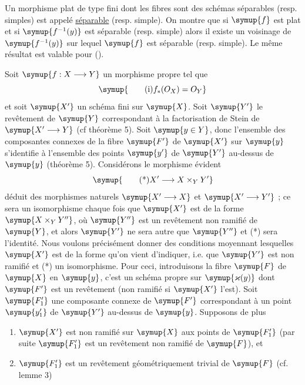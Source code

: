  Un morphisme plat de type fini dont les fibres sont des
schémas séparables (resp. simples) est appelé \uline{séparable} (resp.
simple). On montre que si $\symup{f}$ est plat et si $\symup{f^{-1}(y)}$ est séparable
(resp. simple) alors il existe un voisinage de $\symup{f^{-1}(y)}$ sur lequel $\symup{f}$ est
séparable (resp. simple). Le même résultat est valable pour  (\uline{}).

Soit $\symup{f:X\longrightarrow Y}$ un morphisme propre tel que
\begin{equation}
  \symup{\tag{i}
  f_*(O_X)=O_Y}
\end{equation}
et soit $\symup{X'}$ un schéma fini sur $\symup{X}$. Soit $\symup{Y'}$ le revêtement de $\symup{Y}$
correspondant à la factorisation de Stein de $\symup{X'\longrightarrow Y}$
(cf théorème 5). Soit $\symup{y\in Y}$, donc l'ensemble des composantes connexes de la
fibre $\symup{F'}$ de $\symup{X'}$ sur $\symup{y}$ s'identifie à l'ensemble des points $\symup{y'}$ de $\symup{Y'}$
au-dessus de $\symup{y}$ (théorème 5). Considérons le morphisme évident
\begin{equation}
  \symup{\tag{*}
  X'\longrightarrow X\times_Y Y'}
\end{equation}
déduit des morphismes naturels $\symup{X'\longrightarrow X}$ et
$\symup{X'\longrightarrow Y'}$ ; ce sera un isomorphisme chaque fois que $\symup{X'}$ est de
la forme $\symup{X\times_Y Y''}$, où $\symup{Y''}$ est un revêtement non ramifié de $\symup{Y}$, et
alors $\symup{Y'}$ ne sera autre que $\symup{Y''}$ et (*) sera l'identité. Nous voulons
précisément donner des conditions moyennant lesquelles $\symup{X'}$ est de la forme
qu'on vient d'indiquer, i.e. que $\symup{Y'}$ est non ramifié et (*) un isomorphisme.
Pour ceci, introduisons la fibre $\symup{F}$ de $\symup{X}$ en $\symup{y}$, c'est un schéma propre sur
$\symup{\varkappa(y)}$ dont $\symup{F'}$ est un revêtement (non ramifié si $\symup{X'}$ l'est). Soit
$\symup{F'_1}$ une composante connexe de $\symup{F'}$ correspondant à un point $\symup{y'_1}$ de $\symup{Y'}$
au-dessus de $\symup{y}$. Supposons de plus
\begin{enumerate}
  \item[(ii)] $\symup{X'}$ est non ramifié sur $\symup{X}$ aux points de $\symup{F'_1}$ (par
    suite $\symup{F'_1}$ est un revêtement non ramifié de $\symup{F}$), et
  \item[(iii)] $\symup{F'_1}$ est un revêtement géométriquement trivial de
    $\symup{F}$ (cf. lemme 3)
\end{enumerate}

